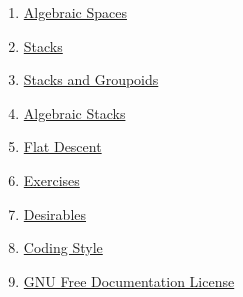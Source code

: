 \begin{multicols}{2}
\begin{enumerate}
\item \hyperref[spaces-section-introduction]{Algebraic Spaces}
\item \hyperref[stacks-section-introduction]{Stacks}
\item \hyperref[stacks-groupoids-section-introduction]{Stacks and Groupoids}
\item \hyperref[algebraic-section-introduction]{Algebraic Stacks}
\item \hyperref[flat-section-introduction]{Flat Descent}
\item \hyperref[exercises-section-algebra]{Exercises}
\item \hyperref[desirables-section-introduction]{Desirables}
\item \hyperref[coding-section-style]{Coding Style}
\item \hyperref[fdl-version]{GNU Free Documentation License}
\end{enumerate}
\end{multicols}
